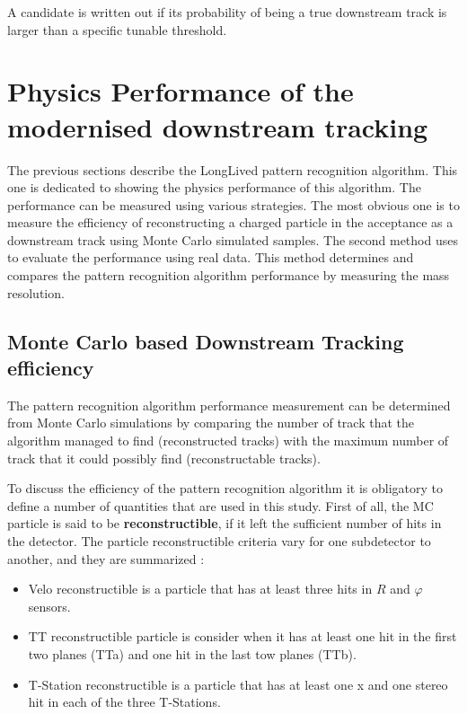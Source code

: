 A candidate is written out if its probability of being a true downstream track is larger than a specific tunable threshold.






\section{Physics Performance of the modernised downstream tracking}
\label{sec:physic_performance}
The previous sections describe the LongLived pattern recognition algorithm. This one is dedicated to showing the physics performance of this algorithm. The performance can be measured using various strategies. The most obvious one is to measure the efficiency of reconstructing a charged particle in the acceptance as a downstream track using Monte Carlo simulated samples.
The second method uses to evaluate the performance using real data. This method determines and compares the pattern recognition algorithm performance by measuring the mass resolution.  

\subsection{Monte Carlo based Downstream Tracking efficiency  }

The pattern recognition algorithm performance measurement can be determined from Monte Carlo simulations by comparing the number of track that the algorithm managed to find (reconstructed tracks) with the maximum number of track that it could possibly find (reconstructable tracks). 

To discuss the efficiency of the pattern recognition algorithm it is obligatory to define a number of quantities that are used in this study.  First of all, the MC particle is said to be \textbf{reconstructible}, if it left the sufficient number of hits in the detector. The particle reconstructible criteria vary for one subdetector to another, and they are summarized \cite{track_def}:

\begin{itemize}
    \item Velo reconstructible is a particle that has at least three hits in $R$ and $\varphi$ sensors.
    \item TT reconstructible particle is consider when it has at least one hit in the first two planes (TTa) and one hit in the last tow planes (TTb). 
    \item T-Station reconstructible is a particle that has at least one x and one stereo hit in each of the three T-Stations. 
\end{itemize}

